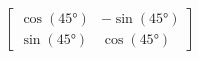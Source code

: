 \documentclass[preview]{standalone}
\begin{document}
\begin{align*}
\begin{bmatrix} \cos(45°) & -\sin(45°) \\ \sin(45°) & \cos(45°) \end{bmatrix}
\end{align*}
\end{document}
